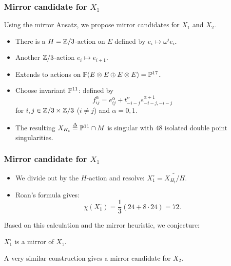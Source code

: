 \begin{frame}
\frametitle{Mirror candidate for $X_1$}

Using the mirror Ansatz, we propose mirror candidates for $X_1$ and $X_2$.

\begin{itemize}
	\item There is a $H=\Z/3$-action on $E$ defined by $e_i \mapsto \omega^i e_i$.
	\item Another $\Z/3$-action $e_i \mapsto e_{i+1}$.
	\item Extends to actions on $\P(E \otimes E \oplus E \otimes E)=\P^{17}$.
	\item Choose invariant $\P^{11}$: defined by
	$$
	f_{ij}^\alpha = e_{ij}^\alpha + t_{-i-j}^\alpha e_{-i-j,-i-j}^{\alpha+1}
	$$
	for $i,j \in \Z/3 \times \Z/3$ ($i \neq j$) and $\alpha = 0,1$.
	\item The resulting $X_{H_t} \stackrel \Delta = \P^{11} \cap M$ is singular with $48$ isolated double point singularities.
\end{itemize}

\end{frame}


\begin{frame}
\frametitle{Mirror candidate for $X_1$}

\begin{itemize}
	\item We divide out by the $H$-action and resolve: $X_1^\circ = \widetilde{X_{H_t}/H}$.
	\item Roan's formula gives:
	$$
	\chi(X_1^\circ) = \frac{1}{3}\left( 24 + 8 \cdot 24 \right) = 72.
	$$
\end{itemize}

Based on this calculation and the mirror heuristic, we conjecture:

\begin{conjecture}
$X_1^\circ$ is a mirror of $X_1$.
\end{conjecture}

\begin{remark}
A very similar construction gives a mirror candidate for $X_2$.
\end{remark}

\end{frame}
